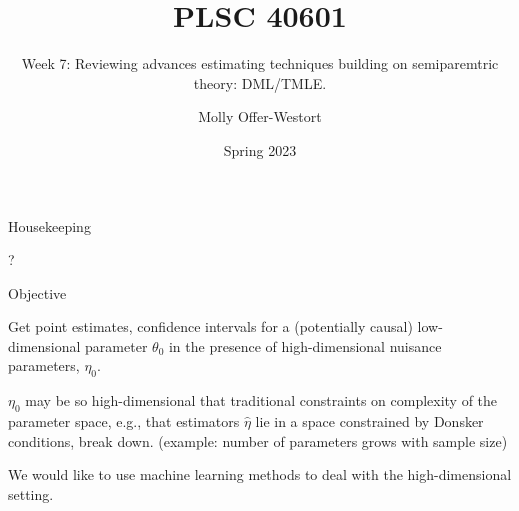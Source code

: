 \documentclass[xcolor={table}]{beamer}
\title{PLSC 40601}
\subtitle{Week 7: Reviewing advances estimating techniques building on semiparemtric theory: DML/TMLE.}
\date{Spring 2023}
\author{Molly Offer-Westort}
\institute{Department of Political Science, \\University of Chicago}
\begin{document}




\frame{\titlepage
\thispagestyle{empty}
}
\begin{frame}{Housekeeping}

\begin{wideitemize}
\item ?
\end{wideitemize}

\end{frame}



% 
% 
% 
\begin{frame}{Objective}

\begin{wideitemize}
\item Get point estimates, confidence intervals for a (potentially causal) low-dimensional parameter $\theta_0$ in the presence of high-dimensional nuisance parameters, $\eta_0$.\pause
\item $\eta_0$ may be so high-dimensional that traditional constraints on complexity of the parameter space, e.g., that estimators $\hat\eta$ lie in a space constrained by Donsker conditions,  break down. \pause (example: number of parameters grows with sample size)\pause
\item We would like to use machine learning methods to deal with the high-dimensional setting. 
\end{wideitemize}

\end{frame}
\end{document}
